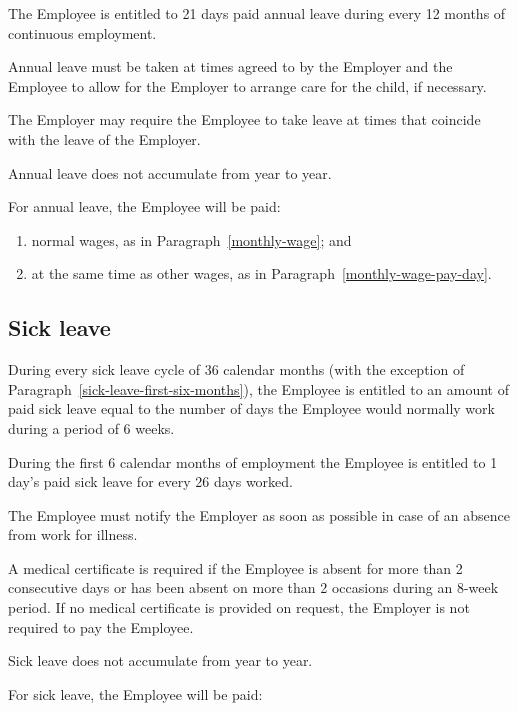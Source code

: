 \documentclass[a4paper,11pt]{article}
\begin{document}
\para The Employee is entitled to 21 days paid annual leave during every 12
months of continuous employment.

\para Annual leave must be taken at times agreed to by the Employer and the
Employee to allow for the Employer to arrange care for the child, if necessary.

\para The Employer may require the Employee to take leave at times that
coincide with the leave of the Employer.

\para Annual leave does not accumulate from year to year.

\para For annual leave, the Employee will be paid:

\begin{enumerate}

  \item normal wages, as in Paragraph~\ref{monthly-wage}; and

  \item at the same time as other wages, as in
    Paragraph~\ref{monthly-wage-pay-day}.

\end{enumerate}

\subsection{Sick leave}
\label{sick-leave}

\para During every sick leave cycle of 36 calendar months (with the exception of
Paragraph~\ref{sick-leave-first-six-months}), the Employee is entitled to an
amount of paid sick leave equal to the number of days the Employee would
normally work during a period of 6 weeks.

\para\label{sick-leave-first-six-months} During the first 6 calendar months of
employment the Employee is entitled to 1 day's paid sick leave for every 26 days
worked.

\para The Employee must notify the Employer as soon as possible in case of an
absence from work for illness.

\para A medical certificate is required if the Employee is absent for more than
2 consecutive days or has been absent on more than 2 occasions during an 8-week
period. If no medical certificate is provided on request, the Employer is not
required to pay the Employee.

\para Sick leave does not accumulate from year to year.

\para For sick leave, the Employee will be paid:
\end{document}
